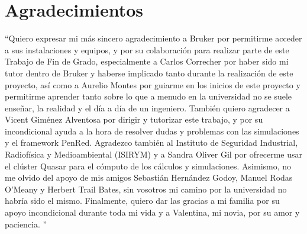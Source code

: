
\chapter*{Agradecimientos}


\begin{parrafoDestacado}
   ``Quiero expresar mi más sincero agradecimiento a Bruker por permitirme acceder a sus instalaciones y equipos, y por su colaboración para realizar parte de este Trabajo de Fin de Grado, especialmente a Carlos Correcher por haber sido mi tutor dentro de Bruker y haberse implicado tanto durante la realización de este proyecto, así como a Aurelio Montes por guiarme en los inicios de este proyecto y permitirme aprender tanto sobre lo que a menudo en la universidad no se suele enseñar, la realidad y el día a día de un ingeniero.
   También quiero agradecer a Vicent Giménez Alventosa por dirigir y tutorizar este trabajo, y por su incondicional ayuda a la hora de resolver dudas y problemas con las simulaciones y el framework PenRed.
   Agradezco también al Instituto de Seguridad Industrial, Radiofísica y Medioambiental (ISIRYM) y a Sandra Oliver Gil por ofrecerme usar el clúster Quasar para el cómputo de los cálculos y simulaciones.
   Asimismo, no me olvido del apoyo de mis amigos Sebastián Hernández Godoy, Manuel Rodas O'Meany y Herbert Trail Bates, sin vosotros mi camino por la universidad no habría sido el mismo.
   Finalmente, quiero dar las gracias a mi familia por su apoyo incondicional durante toda mi vida y a Valentina, mi novia, por su amor y paciencia.
   ''
\end{parrafoDestacado}
